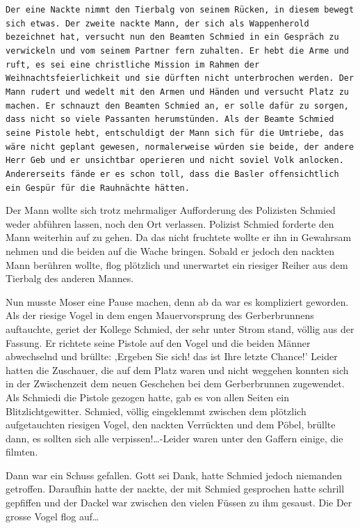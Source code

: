 \documentclass[11pt,titlepage,a5paper]{book}
\begin{document}
{\tt Der eine Nackte nimmt den Tierbalg von seinem Rücken, in diesem bewegt sich etwas. Der zweite nackte Mann, der sich als Wappenherold bezeichnet hat, versucht nun den Beamten Schmied in ein Gespräch zu verwickeln und vom seinem Partner fern zuhalten. Er hebt die Arme und ruft, es sei eine christliche Mission im Rahmen der Weihnachtsfeierlichkeit und sie dürften nicht unterbrochen werden. Der Mann rudert und wedelt mit den Armen und Händen und versucht Platz zu machen. Er schnauzt den Beamten Schmied an, er solle dafür zu sorgen, dass nicht so viele Passanten herumstünden. Als der Beamte Schmied seine  Pistole hebt, entschuldigt der Mann sich für die Umtriebe, das wäre nicht geplant gewesen, normalerweise würden sie beide, der andere Herr Geb und er unsichtbar operieren und nicht soviel Volk anlocken. Andererseits fände er es schon toll, dass die Basler offensichtlich ein Gespür für die Rauhnächte hätten.

Der Mann wollte sich trotz mehrmaliger Aufforderung des Polizisten Schmied weder abführen lassen, noch den Ort verlassen. Polizist Schmied forderte den Mann weiterhin auf zu gehen. Da das nicht fruchtete wollte er ihn in Gewahrsam nehmen und die beiden auf die Wache bringen. Sobald er jedoch den nackten Mann berühren wollte, flog plötzlich und unerwartet ein riesiger Reiher aus dem Tierbalg des anderen Mannes.}

Nun musste Moser eine Pause machen, denn ab da war es kompliziert geworden. Als der riesige Vogel in dem engen Mauervorsprung des Gerberbrunnens auftauchte, geriet der Kollege Schmied, der sehr unter Strom stand, völlig aus der Fassung. Er richtete seine Pistole auf den Vogel und die beiden Männer abwechselnd und brüllte: ,Ergeben Sie sich! das ist Ihre letzte Chance!' Leider hatten die Zuschauer, die auf dem Platz waren und nicht weggehen konnten sich in der Zwischenzeit dem neuen Geschehen bei dem Gerberbrunnen zugewendet. Als Schmiedi die Pistole gezogen hatte, gab es von allen Seiten ein Blitzlichtgewitter. Schmied, völlig eingeklemmt zwischen dem plötzlich aufgetauchten riesigen Vogel, den nackten Verrückten und dem Pöbel,  brüllte dann, es sollten sich alle verpissen!\dots -Leider waren unter den Gaffern einige, die filmten. 

Dann war ein Schuss gefallen. Gott sei Dank, hatte Schmied jedoch niemanden getroffen. Daraufhin hatte der nackte, der mit Schmied gesprochen hatte schrill gepfiffen und der Dackel war zwischen den vielen Füssen zu ihm gesaust. Die Der grosse Vogel flog auf\dots
\end{document}
